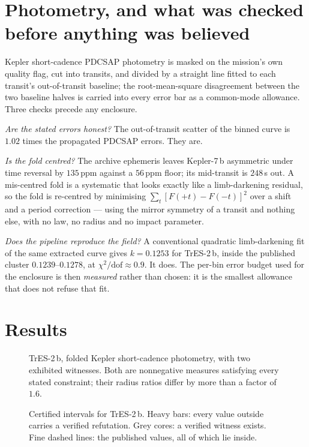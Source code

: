 \documentclass[11pt]{article}
\begin{document}
\section{Photometry, and what was checked before anything was believed}

Kepler short-cadence PDCSAP photometry is masked on the mission's own quality
flag, cut into transits, and divided by a straight line fitted to each transit's
out-of-transit baseline; the root-mean-square disagreement between the two
baseline halves is carried into every error bar as a common-mode allowance.
Three checks precede any enclosure.

\emph{Are the stated errors honest?} The out-of-transit scatter of the binned
curve is $1.02$ times the propagated PDCSAP errors. They are.

\emph{Is the fold centred?} The archive ephemeris leaves Kepler-7\,b asymmetric
under time reversal by $135$\,ppm against a $56$\,ppm floor; its mid-transit is
$248$\,s out. A mis-centred fold is a systematic that looks exactly like a
limb-darkening residual, so the fold is re-centred by minimising
$\sum_t [F(+t)-F(-t)]^2$ over a shift and a period correction --- using the
mirror symmetry of a transit and nothing else, with no law, no radius and no
impact parameter.

\emph{Does the pipeline reproduce the field?} A conventional quadratic
limb-darkening fit of the same extracted curve gives $k=0.1253$ for TrES-2\,b,
inside the published cluster $0.1239$--$0.1278$, at $\chi^2/\mathrm{dof}\approx0.9$.
It does. The per-bin error budget used for the enclosure is then \emph{measured}
rather than chosen: it is the smallest allowance that does not refuse that fit.

\section{Results}

\begin{figure}[t]\centering\figCurve
\caption{TrES-2\,b, folded Kepler short-cadence photometry, with two exhibited
witnesses. Both are nonnegative measures satisfying every stated constraint;
their radius ratios differ by more than a factor of $1.6$.}\end{figure}

\begin{figure}[t]\centering\figLadder
\caption{Certified intervals for TrES-2\,b. Heavy bars: every value outside
carries a verified refutation. Grey cores: a verified witness exists. Fine
dashed lines: the published values, all of which lie inside.}\end{figure}
\end{document}

